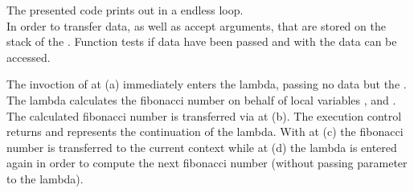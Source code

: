 The presented code prints out  in a endless loop.\\

In order to transfer data, \call as well as \resume accept arguments, that are
stored on the stack of the \currcont. Function \davail tests if data have been
passed and with \dtransfer the data can be accessed.


The invoction of \call at (a) immediately enters the lambda, passing no data
but the \currcont. The lambda calculates the fibonacci number on behalf of local
variables ,  and . The calculated fibonacci number is
transferred via \resume at (b). The execution control returns and 
represents the continuation of the lambda. With \dtransfer at (c) the fibonacci
number is transferred to the current context while at (d) the lambda is entered
again in order to compute the next fibonacci number (without passing parameter
to the lambda).
